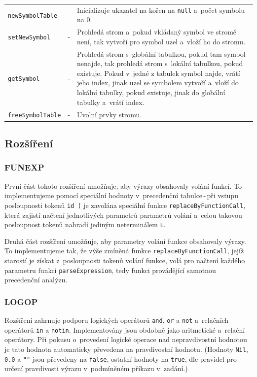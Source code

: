 \documentclass[12pt,a4paper,titlepage,final]{article}
\begin{document}
\begin{tabular}{llp{11.9cm}}
\texttt{newSymbolTable}  & - & Inicializuje ukazatel na kořen na \texttt{null} a~počet symbolu na 0.\\
\texttt{setNewSymbol}    & - & Prohledá strom a~pokud vkládaný symbol ve stromě není, 
                               tak vytvoří pro symbol uzel a~vloží ho do stromu.\\
\texttt{getSymbol}       & - & Prohledá strom s~globální tabulkou, pokud tam symbol nenajde, 
                               tak prohledá strom s~lokální tabulkou, pokud existuje. 
                               Pokud v~jedné z tabulek symbol najde, vrátí jeho index, 
                               jinak uzel se symbolem vytvoří a~vloží do lokální tabulky, 
                               pokud existuje, jinak do globální tabulky a~vrátí index.\\
\texttt{freeSymbolTable} & - & Uvolní prvky stromu.\\
\end{tabular}
\subsection{Rozšíření}
\subsubsection{FUNEXP}
První část tohoto rozšíření umožňuje, aby výrazy obsahovaly volání funkcí. To 
implementujeme pomocí speciální hodnoty v~precedenční tabulce\,-\,při vstupu 
posloupnosti tokenů \texttt{id (} je zavolána speciální funkce 
\texttt{replaceByFunctionCall}, která zajistí načtení jednotlivých parametrů 
parametrů volání a~celou takovou posloupnost tokenů nahradí jediným 
neterminálem \texttt{E}.

Druhá část rozšíření umožňuje, aby parametry volání funkce obsahovaly výrazy. 
To implementujeme tak, že výše zmíněná funkce \texttt{replaceByFunctionCall}, 
jejíž starostí je získat z~posloupnosti tokenů volání funkce, volá pro načtení 
každého parametru funkci \texttt{parseExpression}, tedy funkci provádějící 
samotnou precedenční analýzu.

\subsubsection{LOGOP}
Rozšíření zahrnuje podporu logických operátorů \texttt{and}, \texttt{or} a 
\texttt{not} a~relačních operátorů \texttt{in} a \texttt{notin}. 
Implementovány jsou obdobně jako aritmetické a~relační operátory. Při pokusu 
o~provedení logické operace nad nepravdivostní hodnotou je tato hodnota 
automaticky převedena na pravdivostní hodnotu. (Hodnoty \texttt{Nil}, \texttt{0.0} a 
\texttt{""} jsou převedeny na \texttt{false}, ostatní hodnoty na \texttt{true}, 
dle pravidel pro určení pravdivosti výrazu v~podmíněném příkazu v~zadání.)
\end{document}

